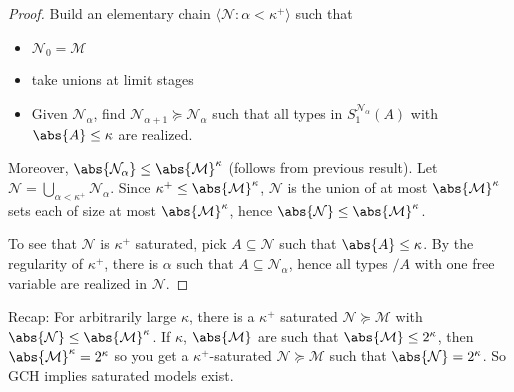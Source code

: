 \documentclass{article}
\newcommand{\M}{\mathcal{M}}
\renewcommand{\N}{\mathcal{N}}
\begin{document}
\begin{proof}
  Build an elementary chain $\langle \N : \alpha < \kappa^+ \rangle$ such that
  \begin{itemize}
    \item $\N_0 = \M$
    \item take unions at limit stages
    \item Given $\N_\alpha$, find $\N_{\alpha + 1} \succcurlyeq \N_\alpha$ such that all types in $S_1^{\N_\alpha}(A)$ with $\abs{A} \leq \kappa$ are realized.
  \end{itemize}
  Moreover, $\abs{\N_\alpha} \leq \abs{\M}^\kappa$ (follows from previous result).
  Let $\N = \bigcup_{\alpha < \kappa^+} \N_\alpha$. Since $\kappa^+ \leq \abs{\mathcal{M}}^\kappa$, $\N$ is the union of at most $\abs{\M}^\kappa$ sets each of size at most $\abs{\M}^\kappa$, hence $\abs{\N} \leq \abs{\M}^\kappa$.

  To see that $\N$ is $\kappa^+$ saturated, pick $A \subseteq \N$ such that $\abs{A} \leq \kappa$.
  By the regularity of $\kappa^+$, there is $\alpha$ such that
  $A \subseteq \N_\alpha$, hence all types $/A$ with one free variable are realized in $\N$.
\end{proof}
Recap: For arbitrarily large $\kappa$, there is a $\kappa^+$ saturated $\N \succcurlyeq \M$ with $\abs{\N} \leq \abs{\M}^\kappa$.
If $\kappa$, $\abs{\M}$ are such that $\abs{\M}\leq 2^\kappa$, then $\abs{\M}^\kappa = 2^\kappa$ so you get a $\kappa^+$-saturated $\N \succcurlyeq \M$ such that $\abs{\N} = 2^\kappa$.
So GCH implies saturated models exist.
\end{document}

